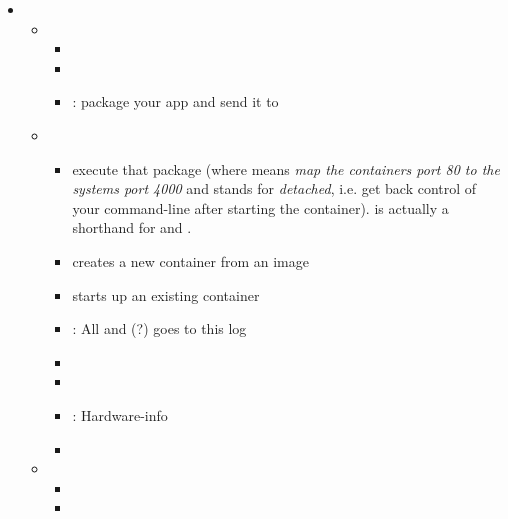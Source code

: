 \begin{itemize}
    \item {} \begin{itemize}
        \item {} \begin{itemize}
                \item {}
                \item {}
                \item {}: package your app and send it to 
            \end{itemize}
        \item {} \begin{itemize}
                \item {}execute that package
                    (where  means \emph{map the containers port 80 to the systems port 4000} and  stands for \emph{detached},
                    i.e. get back control of your command-line after starting the container).  is actually a shorthand for  and .
                \item {} creates a new container from an image
                \item {} starts up an existing container
                \item {}: All  and  (?) goes to this log
                \item {}
                \item {}
                \item {}: Hardware-info
                \item {}
            \end{itemize}
        \item {} \begin{itemize}
                \item {}
                \item {}

\end{itemize}
\end{itemize}
\end{itemize}
